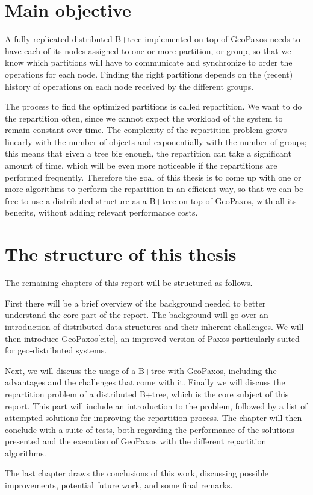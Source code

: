 \section{Main objective}\label{sec:main-objective}
A fully-replicated distributed B+tree implemented on top of GeoPaxos needs to have each of its nodes assigned to one or more partition, or group, so that we know which partitions will have to communicate and synchronize to order the operations for each node. Finding the right partitions depends on the (recent) history of operations on each node received by the different groups.

The process to find the optimized partitions is called repartition. We want to do the repartition often, since we cannot expect the workload of the system to remain constant over time. The complexity of the repartition problem grows linearly with the number of objects and exponentially with the number of groups; this means that given a tree big enough, the repartition can take a significant amount of time, which will be even more noticeable if the repartitions are performed frequently. Therefore the goal of this thesis is to come up with one or more algorithms to perform the repartition in an efficient way, so that we can be free to use a distributed structure as a B+tree on top of GeoPaxos, with all its benefits, without adding relevant performance costs.

\section{The structure of this thesis}\label{the-structure-of-this-thesis}
The remaining chapters of this report will be structured as follows.

First there will be a brief overview of the background needed to better understand the core part of the report. The background will go over an introduction of distributed data structures and their inherent challenges. We will then introduce GeoPaxos[cite], an improved version of Paxos particularly suited for geo-distributed systems. 

Next, we will discuss the usage of a B+tree with GeoPaxos, including the advantages and the challenges that come with it. Finally we will discuss the repartition problem of a distributed B+tree, which is the core subject of this report. This part will include an introduction to the problem, followed by a list of attempted solutions for improving the repartition process. The chapter will then conclude with a suite of tests, both regarding the performance of the solutions presented and the execution of GeoPaxos with the different repartition algorithms.

The last chapter draws the conclusions of this work, discussing possible improvements, potential future work, and some final remarks.